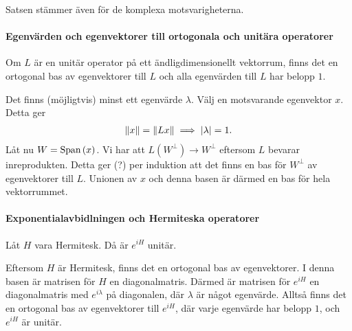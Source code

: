 Satsen stämmer även för de komplexa motsvarigheterna.

\proof

\paragraph{Egenvärden och egenvektorer till ortogonala och unitära operatorer}
Om $L$ är en unitär operator på ett ändligdimensionellt vektorrum, finns det en ortogonal bas av egenvektorer till $L$ och alla egenvärden till $L$ har belopp $1$.

\proof
Det finns (möjligtvis) minst ett egenvärde $\lambda$. Välj en motsvarande egenvektor $x$. Detta ger
\begin{align*}
	\norm{x} = \norm{Lx} \implies \abs{\lambda} = 1.
\end{align*}
Låt nu $W = \text{Span}\left(x\right)$. Vi har att $L(W^{\perp})\to W^{\perp}$ eftersom $L$ bevarar inreprodukten. Detta ger (?) per induktion att det finns en bas för $W^{\perp}$ av egenvektorer till $L$. Unionen av $x$ och denna basen är därmed en bas för hela vektorrummet.

\paragraph{Exponentialavbidlningen och Hermiteska operatorer}
Låt $H$ vara Hermitesk. Då är $e^{iH}$ unitär.

\proof
Eftersom $H$ är Hermitesk, finns det en ortogonal bas av egenvektorer. I denna basen är matrisen för $H$ en diagonalmatris. Därmed är matrisen för $e^{iH}$ en diagonalmatris med $e^{i\lambda}$ på diagonalen, där $\lambda$ är något egenvärde. Alltså finns det en ortogonal bas av egenvektorer till $e^{iH}$, där varje egenvärde har belopp $1$, och $e^{iH}$ är unitär.